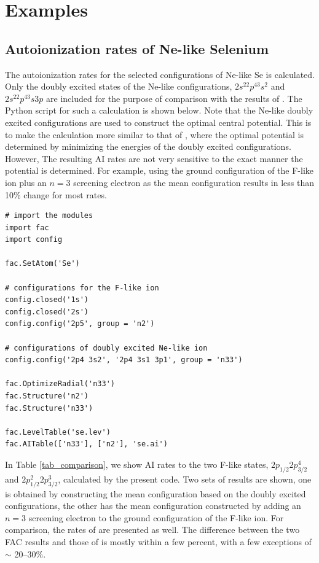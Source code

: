 \documentclass{elsart}
\begin{document}
\section{Examples}
\label{sec_example}
\subsection{Autoionization rates of Ne-like Selenium}
The autoionization rates for the selected configurations of Ne-like Se is
calculated. Only the doubly excited states of the Ne-like configurations, 
$2s^22p^43s^2$ and $2s^22p^43s3p$ are included for the purpose of comparison
with the results of \citet{oreg91}. The Python script for such a calculation is
shown below. Note that the Ne-like doubly excited configurations are used to
construct the optimal central potential. This is to make the calculation
more similar to that of \citet{oreg91}, where the optimal potential is
determined by minimizing the energies of the doubly excited configurations.
However, The
resulting AI rates are not very sensitive to the exact manner the potential
is determined. For example, using the ground configuration of the F-like ion
plus an $n = 3$ screening electron as the mean configuration results in
less than 10\% change for most rates. 

\begin{verbatim}
# import the modules
import fac
import config

fac.SetAtom('Se')

# configurations for the F-like ion
config.closed('1s')
config.closed('2s')
config.config('2p5', group = 'n2')

# configurations of doubly excited Ne-like ion
config.config('2p4 3s2', '2p4 3s1 3p1', group = 'n33')

fac.OptimizeRadial('n33')
fac.Structure('n2')
fac.Structure('n33')

fac.LevelTable('se.lev')
fac.AITable(['n33'], ['n2'], 'se.ai')
\end{verbatim}

In Table \ref{tab_comparison}, we show AI rates to the two F-like
states, $2p_{1/2}2p^4_{3/2}$ and $2p^2_{1/2}2p^3_{3/2}$, calculated by the
present code. Two sets of results are shown, one is obtained by constructing
the mean configuration based on the doubly excited configurations, the other
has the mean configuration constructed by adding an $n = 3$ screening electron
to the ground configuration of the F-like ion. For comparison, the rates of
\citet{oreg91} are presented as 
well. The difference between the two FAC results and those of \citet{oreg91}
is mostly within a few percent, with a few exceptions of $\sim$ 20--30\%. 
 
\end{document}
